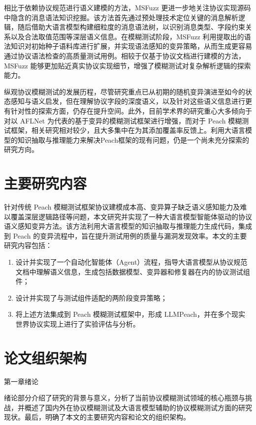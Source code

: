 相比于依赖协议规范进行语义建模的方法，MSFuzz \cite{cheng2024msfuzz} 更进一步地关注协议实现源码中隐含的消息语法知识挖掘。该方法首先通过预处理技术定位关键的消息解析逻辑，随后借助大语言模型构建细粒度的消息语法树，以识别消息类型、字段约束关系以及合法取值范围等深层语义信息。在模糊测试阶段，MSFuzz 利用提取出的语法知识对初始种子语料库进行扩展，并实现语法感知的变异策略，从而生成更容易通过协议语法检查的高质量测试用例。相较于仅基于协议文档进行建模的方法，MSFuzz 能够更加贴近真实协议实现细节，增强了模糊测试对复杂解析逻辑的探索能力。

纵观协议模糊测试的发展历程，尽管研究重点已从初期的随机变异演进至如今的状态感知与语义启发，但在理解协议字段的深度语义，以及针对这些语义信息进行更有针对性的探索方面，仍存在提升空间。此外，目前学术界的研究重心大多倾向于对以 AFLNet 为代表的基于变异的模糊测试框架进行增强，而对于 Peach 模糊测试框架，相关研究相对较少，且大多集中在为其添加覆盖率反馈上\cite{Luoetal2020,Lian2017}。利用大语言模型的知识抽取与推理能力来解决Peach框架的现有问题，仍是一个尚未充分探索的研究方向。

\section{主要研究内容}

针对传统 Peach 模糊测试框架协议建模成本高、变异算子缺乏语义感知能力及难以覆盖深层逻辑路径等问题，本文研究并实现了一种大语言模型智能体驱动的协议语义感知变异方法。该方法利用大语言模型的知识抽取与推理能力生成代码，集成到 Peach 的变异流程中，旨在提升测试用例的质量与漏洞发现效率。本文的主要研究内容包括：

\begin{enumerate}[label=\arabic*)]
    \item 设计并实现了一个自动化智能体（Agent）流程，指导大语言模型从协议规范文档中理解语义信息，生成包括数据模型、变异器和修复器在内的协议测试组件；
    \item 设计并实现了与测试组件适配的两阶段变异策略；
    \item 将上述方法集成到 Peach 模糊测试框架中，形成 LLMPeach，并在多个现实世界协议实现上进行了实验评估与分析。
\end{enumerate}

\section{论文组织架构}
第一章\quad 绪论

绪论部分介绍了研究的背景与意义，分析了当前协议模糊测试领域的核心瓶颈与挑战，并概述了国内外在协议模糊测试及大语言模型辅助的协议模糊测试方面的研究现状。最后，明确了本文的主要研究内容和论文的组织架构。


